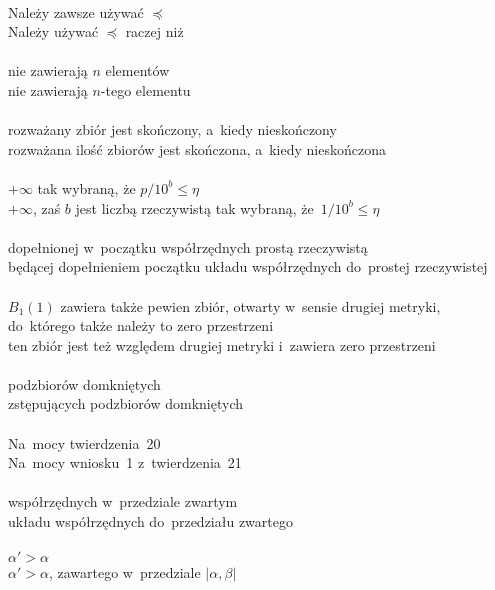 \documentclass[a4paper,11pt]{article}
\begin{document}

\noindent
{} \\
\Jest  Należy zawsze używać $\preceq$ \\
\Powin Należy używać $\preceq$ raczej niż \\
 \\
\Jest  nie zawierają $n$ elementów \\
\Powin nie zawierają $n$-tego elementu \\
 \\
\Jest  rozważany zbiór jest skończony, a~kiedy nieskończony \\
\Powin rozważana ilość zbiorów jest skończona, a~kiedy nieskończona \\
 \\
\Jest  $+\infty$ tak wybraną, że $p / 10^{ b } \leq \eta$ \\
\Powin $+\infty$, zaś $b$ jest liczbą rzeczywistą tak wybraną,
że~$1 / 10^{ b } \leq \eta$ \\
 \\
\Jest dopełnionej w~początku współrzędnych prostą rzeczywistą \\
\Powin będącej dopełnieniem początku układu współrzędnych do~prostej
rzeczywistej \\
 \\
\Jest $B_{ 1 }( 1 )$ zawiera także pewien zbiór, otwarty w~sensie
drugiej
metryki, do~którego także należy to zero przestrzeni \\
\Powin ten zbiór jest też względem drugiej metryki i~zawiera zero
przestrzeni \\ %
 \\
\Jest podzbiorów domkniętych \\
\Powin  zstępujących podzbiorów domkniętych \\
 \\
\Jest Na~mocy twierdzenia~20 \\
\Powin Na~mocy wniosku~1 z~twierdzenia~21 \\
 \\
\Jest współrzędnych w~przedziale zwartym \\
\Powin  układu współrzędnych do~przedziału zwartego \\
 \\
\Jest $\alpha' > \alpha$ \\
\Powin  $\alpha' > \alpha$, zawartego w~przedziale $| \alpha, \beta |$ \\
\end{document}

